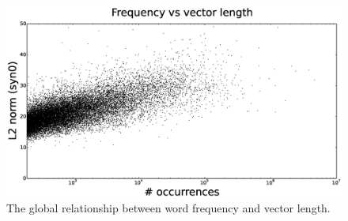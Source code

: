 \documentclass{article} %
\begin{document}
\begin{figure}
\includegraphics[scale=0.3]{frequency-norm-scatterplot}
\caption{ The global relationship between word frequency and vector length.  }
\label{fig:frequency-norm-graph}
\end{figure}
\end{document}
